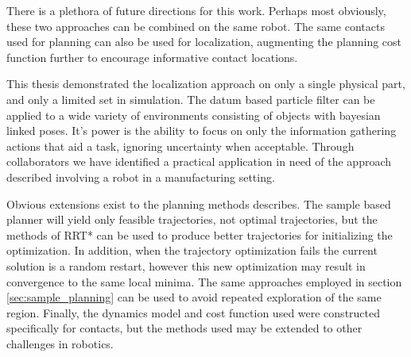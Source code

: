 \documentclass[../thesis.tex]{subfiles}
\begin{document}
There is a plethora of future directions for this work.
Perhaps most obviously, these two approaches can be combined on the same robot.
The same contacts used for planning can also be used for localization, augmenting the planning cost function further to encourage informative contact locations.

This thesis demonstrated the localization approach on only a single physical part, and only a limited set in simulation.
The datum based particle filter can be applied to a wide variety of environments consisting of objects with bayesian linked poses.
It's power is the ability to focus on only the information gathering actions that aid a task, ignoring uncertainty when acceptable.
Through collaborators we have identified a practical application in need of the approach described involving a robot in a manufacturing setting.

Obvious extensions exist to the planning methods describes. The sample based planner will yield only feasible trajectories, not optimal trajectories, but the methods of RRT* can be used to produce better trajectories for initializing the optimization.
In addition, when the trajectory optimization fails the current solution is a random restart, however this new optimization may result in convergence to the same local minima.
The same approaches employed in section \ref{sec:sample_planning} can be used to avoid repeated exploration of the same region.
Finally, the dynamics model and cost function used were constructed specifically for contacts, but the methods used may be extended to other challenges in robotics.
\end{document}
